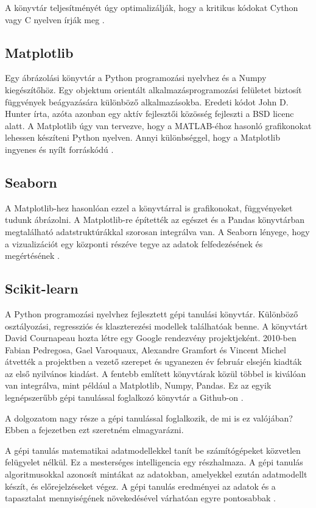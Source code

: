 A könyvtár teljesítményét úgy optimalizálják, hogy a kritikus kódokat Cython vagy C nyelven írják meg \cite{pandas}.

\subsection{Matplotlib}
Egy ábrázolási könyvtár a Python programozási nyelvhez és a Numpy kiegészítőhöz. Egy objektum orientált alkalmazásprogramozási felületet biztosít függvények beágyazására különböző alkalmazásokba. Eredeti kódot John D. Hunter írta, azóta azonban egy aktív fejlesztői közösség fejleszti a BSD licenc alatt. A Matplotlib úgy van tervezve, hogy a MATLAB-éhoz hasonló grafikonokat lehessen készíteni Python nyelven. Annyi különbséggel, hogy a Matplotlib ingyenes és nyílt forráskódú \cite{matplotlib}.

\subsection{Seaborn}
A Matplotlib-hez hasonlóan ezzel a könyvtárral is grafikonokat, függvényeket tudunk ábrázolni. A Matplotlib-re építették az egészet és a Pandas könyvtárban megtalálható adatstruktúrákkal szorosan integrálva van. A Seaborn lényege, hogy a vizualizációt egy központi részéve tegye az adatok felfedezésének és megértésének \cite{seaborn}.

\subsection{Scikit-learn}
A Python programozási nyelvhez fejlesztett gépi tanulási könyvtár. Különböző osztályozási, regressziós és klaszterezési modellek találhatóak benne. A könyvtárt David Cournapeau hozta létre egy Google rendezvény projektjeként. 2010-ben Fabian Pedregosa, Gael Varoquaux, Alexandre Gramfort és Vincent Michel átvették a projektben a vezető szerepet és ugyanezen év február elsején kiadták az első nyilvános kiadást. A fentebb említett könyvtárak közül többel is kiválóan van integrálva, mint például a Matplotlib, Numpy, Pandas. Ez az egyik legnépszerűbb gépi tanulással foglalkozó könyvtár a Github-on \cite{scikit-learn}.

A dolgozatom nagy része a gépi tanulással foglalkozik, de mi is ez valójában? Ebben a fejezetben ezt szeretném elmagyarázni.

A gépi tanulás matematikai adatmodellekkel tanít be számítógépeket közvetlen felügyelet nélkül. Ez a mesterséges intelligencia egy részhalmaza. A gépi tanulás algoritmusokkal azonosít mintákat az adatokban, amelyekkel ezután adatmodellt készít, és előrejelzéseket végez. A gépi tanulás eredményei az adatok és a tapasztalat mennyiségének növekedésével várhatóan egyre pontosabbak \cite{machinelearningbasics}.

